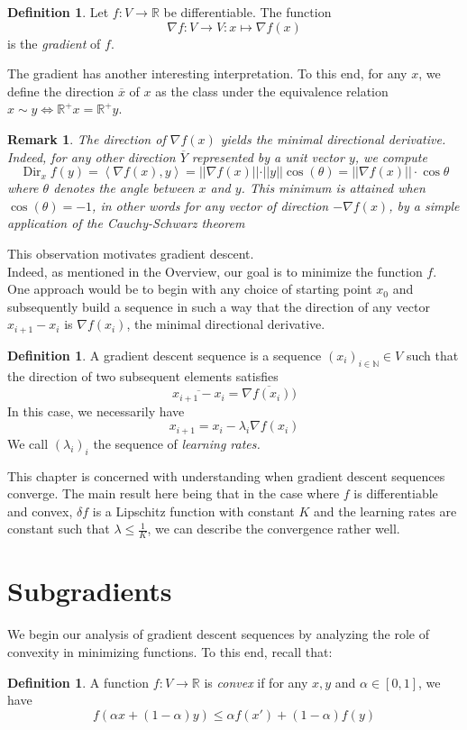 \documentclass{book}
\theoremstyle{plain}
\newtheorem{remark}[corollary]{Remark}
\theoremstyle{definition}
\newtheorem{definition}[corollary]{Definition}
\newcommand{\bl}[2]{\left\langle #1,#2\right\rangle}
\renewcommand{\d}[1]{\mathbb{#1}}
\DeclareMathOperator{\Dir}{Dir}
\newcommand{\fun}{\mapsto}
\newcommand{\mor}{\longrightarrow}
\begin{document}
\begin{definition}
Let $f: V\mor \d{R}$ be differentiable. The function \[\nabla f:  V\mor V: x\fun \nabla f(x)\] is the \emph{gradient} of $f$.
\end{definition}
 The gradient has another interesting interpretation. To this end, for any $x$, we define the direction $\overline{x}$ of $x$ as the class under the equivalence relation $x\sim y \iff \d{R}^+x=\d{R}^+y$. 
\begin{remark}
The direction of $\nabla f(x)$ yields the minimal directional derivative. Indeed, for any other direction $\overline{Y}$ represented by a unit vector $y$, we compute
\[
 \Dir_xf(y) =  \bl{\nabla f(x)}{ y} =\vert \vert \nabla f(x)\vert \vert \cdot \vert \vert y \vert \vert \cos(\theta)=\vert \vert \nabla f(x) \vert \vert \cdot \cos \theta
\] 
where $\theta$ denotes the angle between $x$ and $y$. This minimum is attained when $\cos(\theta)=-1$, in other words for any vector of direction $-\nabla f(x)$, by a simple application of the Cauchy-Schwarz theorem 
\end{remark}

\noindent This observation motivates gradient descent.\\
 Indeed, as mentioned in the Overview, our goal is to minimize the function $f$. One approach would be to begin with any choice of starting point $x_0$ and subsequently build a sequence in such a way that the direction of any vector $x_{i+1}-x_i$ is $\nabla f(x_i)$, the minimal directional derivative.
\begin{definition}
A gradient descent sequence is a sequence $(x_i)_{i \in \d{N}} \in V$ such that the direction of two subsequent elements satisfies
\[
\overline{x_{i+1}-x_i}=\overline{\nabla f(x_i))}
\]
In this case, we necessarily have \[x_{i+1}=x_i-\lambda_i\nabla f(x_i)\]
\noindent We call $(\lambda_i)_i$ the sequence of \emph{learning rates.}
\end{definition}
\noindent This chapter is concerned with understanding when gradient descent sequences converge. The main result here being that in the case where $f$ is differentiable and convex, $\delta f$ is a Lipschitz function with constant $K$ and the learning rates are constant such that $\lambda \le \frac{1}{K}$, we can describe the convergence rather well.

\section{Subgradients}
We begin our analysis of gradient descent sequences by analyzing the role of convexity in minimizing functions. To this end, recall that:
\begin{definition}
A function $f:V\mor \d{R}$ is \emph{convex} if for any $x,y$ and $\alpha \in [0,1]$, we have
\[
f(\alpha x+(1-\alpha)y)\le \alpha f(x')+(1-\alpha)f(y)
\]	
\end{definition}
\end{document}
